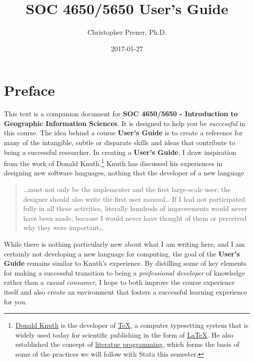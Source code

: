 \documentclass[]{book}
\title{SOC 4650/5650 User's Guide}
\author{Christopher Prener, Ph.D.}
\date{2017-01-27}
\let\rmarkdownfootnote\footnote%
\def\footnote{\protect\rmarkdownfootnote}
\begin{document}
\maketitle

{
\setcounter{tocdepth}{1}
\tableofcontents
}
\chapter*{Preface}\label{preface}

This text is a companion document for \textbf{SOC 4650/5650 -
Introduction to Geographic Information Sciences}. It is designed to help
you be \emph{successful} in this course. The idea behind a course
\textbf{User's Guide} is to create a reference for many of the
intangible, subtle or disparate skills and ideas that contribute to
being a successful researcher. In creating a \textbf{User's Guide}, I
draw inspiration from the work of Donald Knuth.\footnote{\href{https://en.wikipedia.org/wiki/Donald_Knuth}{Donald
  Knuth} is the developer of
  \href{https://en.wikipedia.org/wiki/TeX}{TeX}, a computer typesetting
  system that is widely used today for scientific publishing in the form
  of \href{https://en.wikipedia.org/wiki/LaTeX}{LaTeX}. He also
  established the concept of
  \href{https://en.wikipedia.org/wiki/Literate_programming}{literatue
  programming}, which forms the basis of some of the practices we will
  follow with Stata this semester.} Knuth has discussed his experiences
in designing new software languages, nothing that the developer of a new
language

\begin{quote}
\ldots{}must not only be the implementer and the first large-scale user;
the designer should also write the first user manual\ldots{} If I had
not participated fully in all these activities, literally hundreds of
improvements would never have been made, because I would never have
thought of them or perceived why they were important\ldots{}
\end{quote}

While there is nothing particularly new about what I am writing here,
and I am certainly not developing a new language for computing, the goal
of the \textbf{User's Guide} remains similar to Knuth's experience. By
distilling some of key elements for making a successful transition to
being a \emph{professional developer} of knowledge rather than a
\emph{casual consumer}, I hope to both improve the course experience
itself and also create an environment that fosters a successful learning
experience for you.
\end{document}

